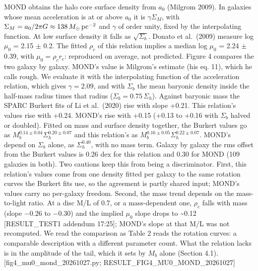 \documentclass[
  10pt,
]{article}
\begin{document}
MOND obtains the halo core surface density from $a_0$ (Milgrom 2009). In galaxies whose mean acceleration is at or above $a_0$ it is $\gamma\Sigma_M$, with $\Sigma_M=a_0/2\pi G\approx138\,M_\odot\,{\rm pc}^{-2}$ and $\gamma$ of order unity, fixed by the interpolating function. At low surface density it falls as $\sqrt{\Sigma_b}$. Donato et al.~(2009) measure log $\mu_0$ = 2.15 $\pm$ 0.2. The fitted $\rho_c$ of this relation implies a median log $\mu_0$ = 2.24 $\pm$ 0.39, with $\mu_0=\rho_c r_c$: reproduced on average, not predicted. Figure 4 compares the two galaxy by galaxy. MOND's value is Milgrom's estimate (his eq. 11), which he calls rough. We evaluate it with the interpolating function of the acceleration relation, which gives $\gamma=2.09$, and with $\Sigma_b$ the mean baryonic density inside the half-mass radius times that radius ($\Sigma_b=0.75\,\Sigma_h$). Against baryonic mass the SPARC Burkert fits of Li et al.~(2020) rise with slope +0.21. This relation's values rise with +0.24. MOND's rise with +0.15 (+0.13 to +0.16 with $\Sigma_b$ halved or doubled). Fitted on mass and surface density together, the Burkert values go as $M_b^{0.14\pm0.04}\Sigma_h^{0.20\pm0.07}$ and this relation's as $M_b^{0.16\pm0.05}\Sigma_h^{0.22\pm0.07}$. MOND's depend on $\Sigma_b$ alone, as $\Sigma_h^{0.40}$, with no mass term. Galaxy by galaxy the rms offset from the Burkert values is 0.26 dex for this relation and 0.30 for MOND (109 galaxies in both). Two cautions keep this from being a discriminator. First, this relation's values come from one density fitted per galaxy to the same rotation curves the Burkert fits use, so the agreement is partly shared input; MOND's values carry no per-galaxy freedom. Second, the mass trend depends on the mass-to-light ratio. At a disc M/L of 0.7, or a mass-dependent one, $\rho_c$ falls with mass (slope $-0.26$ to $-0.30$) and the implied $\mu_0$ slope drops to \textasciitilde{}0.12 {[}RESULT\_TEST1 addendum 17:25{]}; MOND's slope at that M/L was not recomputed. We read the comparison as Table 2 reads the rotation curves: a comparable description with a different parameter count. What the relation lacks is in the amplitude of the tail, which it sets by $M_b$ alone (Section 4.1). {[}fig4\_mu0\_mond\_20261027.py; RESULT\_FIG4\_MU0\_MOND\_20261027{]}
\end{document}

